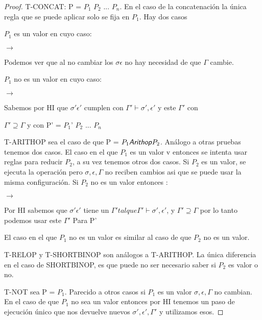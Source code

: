 \begin{proof}
T-CONCAT: P = $P_{1}$ $P_{2}$ ... $P_{n}$. En el caso de la concatenación la única regla que se puede aplicar solo se fija en $P_{1}$.
Hay dos casos

$P_{1}$ es un valor en cuyo caso: 

  $\rightarrow$ 

Podemos ver que al no cambiar los $\sigma \epsilon$ no hay necesidad de que $\Gamma$ cambie.

$P_{1}$ no es un valor en cuyo caso:  

  $\rightarrow$ 

Sabemos por HI que $\sigma' \epsilon'$ cumplen con $\Gamma' \vdash \sigma', \epsilon'$ y este $\Gamma'$ con 

$\Gamma' \supseteq  \Gamma$ y  con P' = $P_{1}$' $P_{2}$ ... $P_{n}$

T-ARITHOP sea el caso de que P = $P_{1} \textsf{\textit{Arithop}} P_{2}$. Análogo a otras pruebas tenemos dos casos.
El caso en el que $P_{1}$ es un valor v entonces se intenta usar reglas para reducir $P_{2}$, a su vez tenemos otros dos casos.
Si $P_{2}$ es un valor, se ejecuta la operación pero $\sigma, \epsilon, \Gamma$ no reciben cambios asi que se puede usar la misma configuración.
Si $P_{2}$ no es un valor entonces :

  $\rightarrow$  %

Por HI sabemos que $\sigma' \epsilon'$ tiene un $\Gamma' tal que \Gamma' \vdash \sigma', \epsilon'$,
 y $\Gamma' \supseteq  \Gamma$ por lo tanto podemos usar este $\Gamma'$ Para P'

El caso en el que $P_{1}$ no es un valor es similar al caso de que $P_{2}$ no es un valor.

T-RELOP y T-SHORTBINOP son análogos a T-ARITHOP. La única diferencia en el caso de SHORTBINOP, es que puede no ser necesario saber si $P_{2}$ es valor o no.

T-NOT  sea P =  $P_{1}$. Parecido a otros casos si $P_{1}$ es un valor $\sigma, \epsilon, \Gamma$ no cambian.
En el caso de que $P_{1}$ no sea un valor entonces por HI tenemos un paso de ejecución único que nos devuelve nuevos $\sigma', \epsilon', \Gamma'$ y utilizamos esos.


\end{proof}
